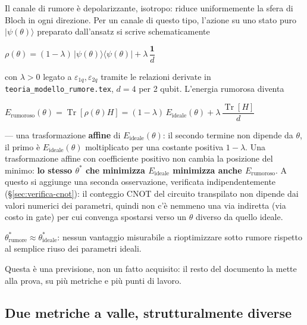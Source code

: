 \documentclass[11pt,a4paper]{article}
\newcommand{\Tr}{\operatorname{Tr}}
\newcommand{\ket}[1]{\lvert #1 \rangle}
\newcommand{\bra}[1]{\langle #1 \rvert}
\begin{document}
Il canale di rumore è depolarizzante, isotropo: riduce uniformemente la
sfera di Bloch in ogni direzione. Per un canale di questo tipo, l'azione
su uno stato puro $\ket{\psi(\theta)}$ preparato dall'ansatz si scrive
schematicamente
\begin{keyeq}
\centering
$\rho(\theta) = (1-\lambda)\,\ket{\psi(\theta)}\bra{\psi(\theta)} + \lambda\,\dfrac{\mathbf{1}}{d}$
\end{keyeq}
con $\lambda>0$ legato a $\varepsilon_{1q},\varepsilon_{2q}$ tramite le
relazioni derivate in \texttt{teoria\_modello\_rumore.tex}, $d=4$ per 2
qubit. L'energia rumorosa diventa
\begin{keyeq}
\centering
$E_\text{rumoroso}(\theta) = \Tr[\rho(\theta) H] = (1-\lambda)\,E_\text{ideale}(\theta) + \lambda\,\dfrac{\Tr[H]}{d}$
\end{keyeq}
--- una trasformazione \textbf{affine} di $E_\text{ideale}(\theta)$: il
secondo termine non dipende da $\theta$, il primo è $E_\text{ideale}(\theta)$
moltiplicato per una costante positiva $1-\lambda$. Una trasformazione
affine con coefficiente positivo non cambia la posizione del minimo:
\textbf{lo stesso $\theta^*$ che minimizza $E_\text{ideale}$ minimizza
anche $E_\text{rumoroso}$}. A questo si aggiunge una seconda osservazione,
verificata indipendentemente (§\ref{sec:verifica-cnot}): il conteggio CNOT
del circuito transpilato non dipende dai valori numerici dei parametri,
quindi non c'è nemmeno una via indiretta (via costo in gate) per cui
convenga spostarsi verso un $\theta$ diverso da quello ideale.

\begin{keyeq}[title={Previsione dichiarata prima della verifica}]
\centering
$\theta^*_\text{rumore} \approx \theta^*_\text{ideale}$: nessun vantaggio
misurabile a rioptimizzare sotto rumore rispetto al semplice riuso dei
parametri ideali.
\end{keyeq}

Questa è una previsione, non un fatto acquisito: il resto del documento
la mette alla prova, su più metriche e più punti di lavoro.

\subsection{Due metriche a valle, strutturalmente diverse}
\label{sec:due-metriche}
\end{document}
